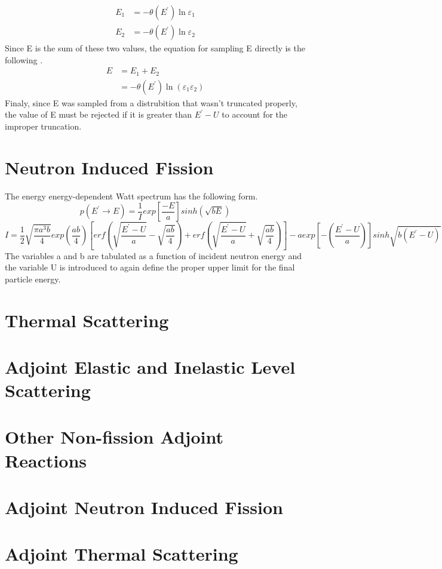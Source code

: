 \begin{align}
  E_1 & = -\theta(E^{'})\ln{\varepsilon_1} \\
  E_2 & = -\theta(E^{'})\ln{\varepsilon_2} 
\end{align}
Since E is the sum of these two values, the equation for sampling E directly
is the following \citep{x-5_monte_carlo_team_mcnp_2003}.
\begin{align}
  E & = E_1 + E_2 \nonumber \\
  & = -\theta(E^{'})\ln{(\varepsilon_1\varepsilon_2)}
\end{align}
Finaly, since E was sampled from a distrubition that wasn't truncated properly,
the value of E must be rejected if it is greater than $E^{'}-U$ to account for
the improper truncation.

\section{Neutron Induced Fission}
The energy energy-dependent Watt spectrum
has the following form.
\begin{equation}
  p(E^{'} \to E) = \frac{1}{I}exp\left[\frac{-E}{a}\right]sinh\left(\sqrt{bE}
  \right)
\end{equation}
\begin{equation}
  I = \frac{1}{2}\sqrt{\frac{\pi a^3b}{4}}exp\left(\frac{ab}{4}\right)\left[
    erf\left(\sqrt{\frac{E^{'}-U}{a}} - \sqrt{\frac{ab}{4}}\right) +
    erf\left(\sqrt{\frac{E^{'}-U}{a}} + \sqrt{\frac{ab}{4}}\right)\right] -
    a exp\left[-\left(\frac{E^{'}-U}{a}\right)\right]sinh\sqrt{b(E^{'}-U)}
\end{equation}
The variables a and b are tabulated as a function of incident neutron energy 
and the variable U is introduced to again define the proper upper limit for the
final particle energy. 

\section{Thermal Scattering}

\section{Adjoint Elastic and Inelastic Level Scattering}

\section{Other Non-fission Adjoint  Reactions}

\section{Adjoint Neutron Induced Fission}

\section{Adjoint Thermal Scattering}


